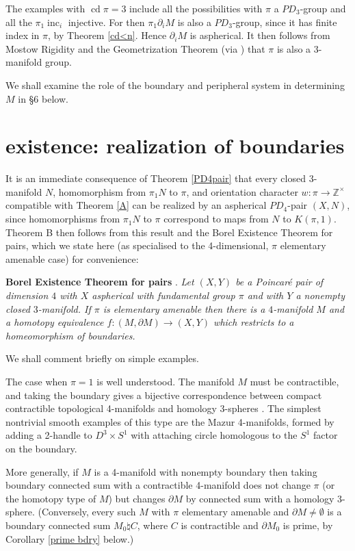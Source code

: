 \documentclass[12pt]{amsart}
\theoremstyle{definition}
\DeclareMathOperator{\cd}{cd}
\DeclareMathOperator{\inc}{inc}
\begin{document}
The examples with $\cd\pi=3$ include all the possibilities 
with $\pi$ a $PD_3$-group and all the $\pi_1\inc_i$ injective.
For then $\pi_1\partial_i{M}$ is also a $PD_3$-group,
since it has finite index in $\pi$, by Theorem \ref{cd<n}.
Hence $\partial_i{M}$ is aspherical.
It then follows from Mostow Rigidity and the Geometrization Theorem 
(via \cite{MS86,Zi82}) that $\pi$ is also a 3-manifold group.

We shall examine the role of the boundary and peripheral system 
in determining $M$ in \S6 below.

\section{existence: realization of boundaries}

It is an immediate consequence of Theorem \ref{PD4pair} that every closed 3-manifold $N$, 
homomorphism from $\pi_1N$ to $\pi$,
and orientation character $w:\pi\to\mathbb{Z}^\times$
compatible with Theorem \ref{A} can be realized by an aspherical $PD_4$-pair $(X,N)$,
since homomorphisms  from $\pi_1N$ to $\pi$ correspond to maps from $N$ to $K(\pi,1)$.
Theorem B then follows from this result and the Borel Existence Theorem for pairs,
which we state here (as specialised to the 4-dimensional,  $\pi$ elementary amenable
case) for convenience:

\smallskip
\noindent
{\bf Borel Existence Theorem for pairs}
\cite[Theorem C]{dh1}.
{\it Let $(X,Y)$ be a Poincar\'e pair of dimension $4$ with $X$ aspherical 
with fundamental group $\pi$ and with $Y$ a nonempty closed $3$-manifold.
If $\pi$ is elementary amenable then there is a $4$-manifold $M$ and 
a homotopy equivalence $f:(M,\partial{M})\to(X,Y)$ which restricts to a homeomorphism of boundaries.}
 
\smallskip
We shall comment briefly on simple examples.

The case when $\pi=1$ is well understood.
The manifold $M$ must be contractible, 
and taking the boundary gives a bijective correspondence between compact
contractible topological 4-manifolds and homology 3-spheres 
\cite[Corollary 9.3C and Proposition 11.6A]{FQ}. 
The simplest nontrivial smooth examples of this type are the Mazur 4-manifolds, 
formed by adding a 2-handle to $D^3\times{S^1}$ with attaching circle homologous 
to the $S^1$ factor on the boundary.

More generally, if $M$ is a 4-manifold with nonempty boundary then
taking boundary connected sum with a contractible 4-manifold does not change $\pi$ 
(or the homotopy type of $M$)
 but changes $\partial{M}$ by connected sum with a homology 3-sphere.
(Conversely, every such $M$ with $\pi$ elementary amenable and 
$\partial{M}\not=\emptyset$ is a boundary connected sum $M_0\natural{C}$, 
where $C$ is contractible and $\partial{M_0}$ is prime,
by Corollary \ref{prime bdry} below.)
\end{document}
